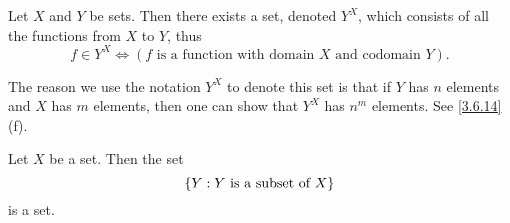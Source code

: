 \begin{ax}\label{3.10}
  Let \(X\) and \(Y\) be sets.
  Then there exists a set, denoted \(Y^X\), which consists of all the functions from \(X\) to \(Y\), thus
  \[
    f \in Y^X \iff (f \text{ is a function with domain } X \text{ and codomain } Y).
  \]
\end{ax}

\begin{note}
  The reason we use the notation \(Y^X\) to denote this set is that if \(Y\) has \(n\) elements and \(X\) has \(m\) elements, then one can show that \(Y^X\) has \(n^m\) elements.
  See \cref{3.6.14}(f).
\end{note}

\setcounter{thm}{8}
\begin{lem}\label{3.4.9}
  Let \(X\) be a set.
  Then the set
  \[
    \left\lbrace Y : Y \text{ is a subset of } X\right\rbrace
  \]
  is a set.
\end{lem}

